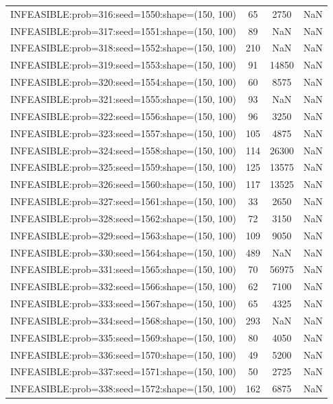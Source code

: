 \begin{longtable}{lccc}
INFEASIBLE:prob=316:seed=1550:shape=(150, 100) &    65 &  2750 &    NaN \\
INFEASIBLE:prob=317:seed=1551:shape=(150, 100) &    89 &   NaN &    NaN \\
INFEASIBLE:prob=318:seed=1552:shape=(150, 100) &   210 &   NaN &    NaN \\
INFEASIBLE:prob=319:seed=1553:shape=(150, 100) &    91 & 14850 &    NaN \\
INFEASIBLE:prob=320:seed=1554:shape=(150, 100) &    60 &  8575 &    NaN \\
INFEASIBLE:prob=321:seed=1555:shape=(150, 100) &    93 &   NaN &    NaN \\
INFEASIBLE:prob=322:seed=1556:shape=(150, 100) &    96 &  3250 &    NaN \\
INFEASIBLE:prob=323:seed=1557:shape=(150, 100) &   105 &  4875 &    NaN \\
INFEASIBLE:prob=324:seed=1558:shape=(150, 100) &   114 & 26300 &    NaN \\
INFEASIBLE:prob=325:seed=1559:shape=(150, 100) &   125 & 13575 &    NaN \\
INFEASIBLE:prob=326:seed=1560:shape=(150, 100) &   117 & 13525 &    NaN \\
INFEASIBLE:prob=327:seed=1561:shape=(150, 100) &    33 &  2650 &    NaN \\
INFEASIBLE:prob=328:seed=1562:shape=(150, 100) &    72 &  3150 &    NaN \\
INFEASIBLE:prob=329:seed=1563:shape=(150, 100) &   109 &  9050 &    NaN \\
INFEASIBLE:prob=330:seed=1564:shape=(150, 100) &   489 &   NaN &    NaN \\
INFEASIBLE:prob=331:seed=1565:shape=(150, 100) &    70 & 56975 &    NaN \\
INFEASIBLE:prob=332:seed=1566:shape=(150, 100) &    62 &  7100 &    NaN \\
INFEASIBLE:prob=333:seed=1567:shape=(150, 100) &    65 &  4325 &    NaN \\
INFEASIBLE:prob=334:seed=1568:shape=(150, 100) &   293 &   NaN &    NaN \\
INFEASIBLE:prob=335:seed=1569:shape=(150, 100) &    80 &  4050 &    NaN \\
INFEASIBLE:prob=336:seed=1570:shape=(150, 100) &    49 &  5200 &    NaN \\
INFEASIBLE:prob=337:seed=1571:shape=(150, 100) &    50 &  2725 &    NaN \\
INFEASIBLE:prob=338:seed=1572:shape=(150, 100) &   162 &  6875 &    NaN \\

\end{longtable}
